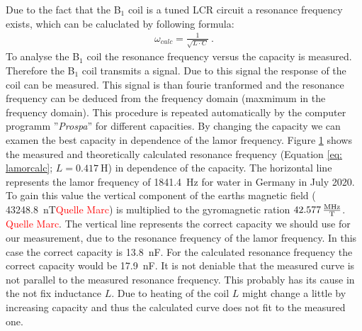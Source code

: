 Due to the fact that the B$_1$ coil is a tuned LCR circuit a resonance frequency exists, which can be caluclated by following formula:
\begin{align}
    \omega_{calc} = \frac{1}{\sqrt{L \cdot C}} \ .
    \label{eq: lamorcalc}
\end{align}
To analyse the B$_1$ coil the resonance frequency versus the capacity is measured. Therefore the B$_1$ coil transmits a signal. Due to this signal the response of the coil can be measured. This signal is than fourie tranformed and the resonance frequency can be deduced from the frequency domain (maxmimum in the frequency domain). This procedure is repeated automatically by the computer programm ''\textit{Prospa}'' for different capacities. By changing the capacity we can examen the best capacity in dependence of the lamor frequency. Figure \ref{fig: Coilanalyse} shows the measured and theoretically calculated resonance frequency (Equation \ref{eq: lamorcalc}; $L = \SI{0.417}{\henry}$) in dependence of the capacity. The horizontal line represents the lamor frequency of \SI{1841.4}{\hertz} for water in Germany in July 2020. To gain this value the vertical component of the earths magnetic field ( \SI{43248.8}{\nano \tesla}\textcolor{red}{Quelle Marc}) is multiplied to the gyromagnetic ration $\SI{42.577}{\frac{\mega \hertz}{\tesla}}$. \textcolor{red}{Quelle Marc}. The vertical line represents the correct capacity we should use for our measurement, due to the resonance frequency of the lamor frequency. In this case the correct capacity is \SI{13.8}{\nano \farad}. For the calculated resonance frequency the correct capacity would be \SI{17.9}{\nano \farad}. It is not deniable that the measured curve is not parallel to the measured resonance frequency. This probably has its cause in the not fix inductance $L$. Due to heating of the coil $L$ might change a little by increasing capacity and thus the calculated curve does not fit to the measured one.


\begin{figure}[H]
    \centering
    
    \caption[]{}
    \label{fig: Coilanalyse}
\end{figure}